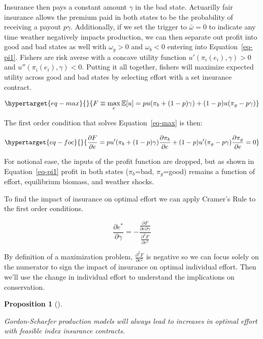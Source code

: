 \documentclass[
  letterpaper,
  DIV=11,
  numbers=noendperiod]{scrartcl}
\theoremstyle{plain}
\theoremstyle{plain}
\newtheorem{proposition}{Proposition}[section]
\theoremstyle{remark}
\begin{document}
Insurance then pays a constant amount \(\gamma\) in the bad state.
Actuarilly fair insurance allows the premium paid in both states to be
the probability of receiving a payout \(p\gamma\). Additionally, if we
set the trigger to \(\bar\omega=0\) to indicate any time weather
negatively impacts production, we can then separate out profit into good
and bad states as well with \(\omega_g>0\) and \(\omega_b<0\) entering
into Equation~\ref{eq-pi1}. Fishers are risk averse with a concave
utility function \(u'(\pi_i(e_i),\gamma)>0\) and
\(u''(\pi_i(e_i),\gamma)<0\). Putting it all together, fishers will
maximize expected utility across good and bad states by selecting effort
with a set insurance contract.

\begin{equation}\protect\hypertarget{eq-max}{}{
F\equiv\max_{e}\mathbb{E}[u]=pu(\pi_b+(1-p)\gamma)+(1-p)u(\pi_g-p\gamma)
}\label{eq-max}\end{equation}

The first order condition that solves Equation~\ref{eq-max} is then:

\begin{equation}\protect\hypertarget{eq-foc}{}{
\frac{\partial F}{\partial e}=pu'(\pi_b+(1-p)\gamma)\frac{\partial \pi_b}{\partial e}+(1-p)u'(\pi_g-p\gamma)\frac{\partial \pi_g}{\partial e}=0
}\label{eq-foc}\end{equation}

For notional ease, the inputs of the profit function are dropped, but as
shown in Equation~\ref{eq-pi1} profit in both states (\(\pi_b\)=bad,
\(\pi_g\)=good) remains a function of effort, equilibrium biomass, and
weather shocks.

To find the impact of insurance on optimal effort we can apply Cramer's
Rule to the first order conditions.

\[
\frac{\partial e^*}{\partial \gamma}=-\frac{\frac{\partial F}{\partial e \partial \gamma}}{\frac{\partial^2 F}{\partial e^2}}
\]

By definition of a maximization problem,
\(\frac{\partial^2 F}{\partial e^2}\) is negative so we can focus solely
on the numerator to sign the impact of insurance on optimal individual
effort. Then we'll use the change in individual effort to understand the
implications on conservation.

\begin{proposition}[]\protect\hypertarget{prp-cp}{}\label{prp-cp}

Gordon-Schaefer production models will always lead to increases in
optimal effort with feasible index insurance contracts.

\end{proposition}
\end{document}
